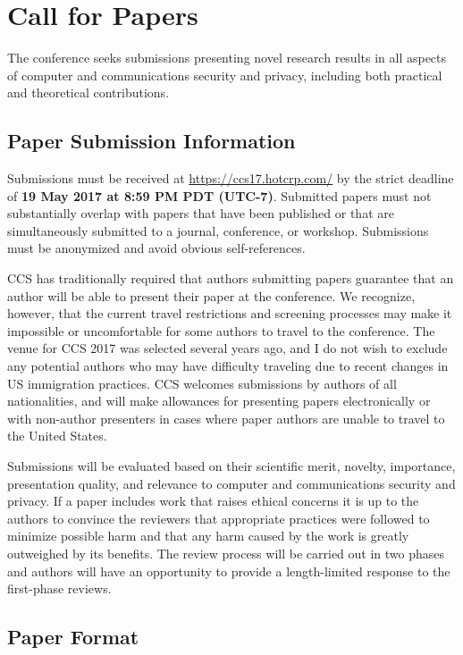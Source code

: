 \section{Call for Papers}

The conference seeks submissions presenting novel research results in
all aspects of computer and communications security and privacy,
including both practical and theoretical contributions.

\subsection{Paper Submission Information}

Submissions must be received at \url{https://ccs17.hotcrp.com/} by the
strict deadline of {\bf 19 May 2017 at 8:59 PM PDT (UTC-7)}.
Submitted papers must not substantially overlap with papers that have
been published or that are simultaneously submitted to a journal,
conference, or workshop. Submissions must be anonymized and avoid
obvious self-references.

CCS has traditionally required that authors submitting papers
guarantee that an author will be able to present their paper at the
conference. We recognize, however, that the current travel
restrictions and screening processes may make it impossible or
uncomfortable for some authors to travel to the conference. The venue
for CCS 2017 was selected several years ago, and I do not wish to
exclude any potential authors who may have difficulty traveling due to
recent changes in US immigration practices.  CCS welcomes submissions
by authors of all nationalities, and will make allowances for
presenting papers electronically or with non-author presenters in
cases where paper authors are unable to travel to the United States.

Submissions will be evaluated based on their scientific merit,
novelty, importance, presentation quality, and relevance to computer
and communications security and privacy.  If a paper includes work
that raises ethical concerns it is up to the authors to convince the
reviewers that appropriate practices were followed to minimize
possible harm and that any harm caused by the work is greatly
outweighed by its benefits. The review process will be carried out in
two phases and authors will have an opportunity to provide a
length-limited response to the first-phase reviews.

\subsection{Paper Format}

